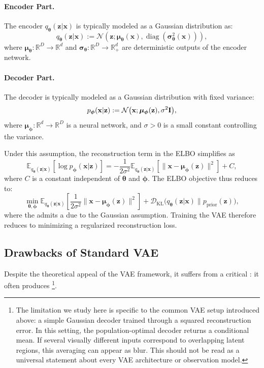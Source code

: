 \paragraph{Encoder Part.}
The encoder $ q_{\bm{\theta}}(\mathbf{z} | \mathbf{x}) $ is typically modeled as a Gaussian distribution as:
\[
q_{\bm{\theta}}(\mathbf{z} | \mathbf{x}) := \mathcal{N}\left(\mathbf{z}; \bm{\mu}_{\bm{\theta}}(\mathbf{x}), \operatorname{diag}(\bm{\sigma}_{\bm{\theta}}^2(\mathbf{x}))\right),
\]
where $\bm{\mu}_{\bm{\theta}} : \mathbb{R}^D \to \mathbb{R}^d$ and $\bm{\sigma}_{\bm{\theta}} : \mathbb{R}^D \to \mathbb{R}_+^d$ are deterministic outputs of the encoder network.
\paragraph{Decoder Part.} The decoder is typically modeled as a Gaussian distribution with fixed variance:
\[
p_{\bm{\phi}}(\mathbf{x}|\mathbf{z}) := \mathcal{N}\bigl(\mathbf{x}; \bm{\mu}_{\bm{\phi}}(\mathbf{z}), \sigma^2 {\mathbf{I}}\bigr),
\]
where $\bm{\mu}_{\bm{\phi}} : \mathbb{R}^d \to \mathbb{R}^D$ is a neural network, and $\sigma > 0$ is a small constant controlling the variance.
 
Under this assumption, the reconstruction term in the ELBO simplifies as
\[
\mathbb{E}_{q_{\bm{\theta}}(\mathbf{z} | \mathbf{x})} \left[\log p_{\bm{\phi}}(\mathbf{x} | \mathbf{z})\right]
= - \frac{1}{2\sigma^2} \mathbb{E}_{q_{\bm{\theta}}(\mathbf{z} | \mathbf{x})} \left[\|\mathbf{x} - \bm{\mu}_{\bm{\phi}}(\mathbf{z})\|^2\right] + C,
\]
where $C$ is a constant independent of $\bm{\theta}$ and $\bm{\phi}$. The ELBO objective thus reduces to:
\[
\min_{\bm{\theta}, \bm{\phi}}  \mathbb{E}_{q_{\bm{\theta}}(\mathbf{z} | \mathbf{x})} \left[ \frac{1}{2\sigma^2} \|\mathbf{x} - \bm{\mu}_{\bm{\phi}}(\mathbf{z})\|^2 \right]
+ \mathcal{D}_{\mathrm{KL}}\big(q_{\bm{\theta}}(\mathbf{z} | \mathbf{x}) \| p_{\mathrm{prior}}(\mathbf{z})\big),
\]
where the  admits a  due to the Gaussian assumption. Training the VAE therefore reduces to minimizing a regularized reconstruction loss.

\subsection{Drawbacks of Standard VAE}\label{sec:drawback_standard_VAE}
Despite the theoretical appeal of the VAE framework, it suffers from a critical : it often produces \footnote{The limitation we study here is specific to the common VAE setup introduced
above: a simple Gaussian decoder trained through a squared reconstruction
error. In this setting, the population-optimal decoder returns a conditional
mean. If several visually different inputs correspond to overlapping latent
regions, this averaging can appear as blur. This should not be read as a
universal statement about every VAE architecture or observation model.}.

